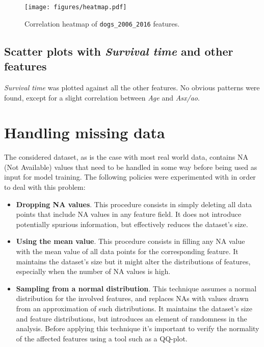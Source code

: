 \documentclass[12pt]{report}
\begin{document}
\begin{figure}[h]
  \centering
  	\texttt{[image: figures/heatmap.pdf]}
  \caption{Correlation heatmap of \texttt{dogs\_2006\_2016} features.}
  \label{corrheatmap}
\end{figure}

\subsection*{Scatter plots with \textit{Survival time} and other features}
\textit{Survival time} was plotted against all the other features. No obvious patterns were found, except for a slight correlation between \textit{Age} and \textit{Asx/ao}.

\section{Handling missing data}
The considered dataset, as is the case with most real world data, contains NA (Not Available) values that need to be handled in some way before being used as input for model training. The following policies were experimented with in order to deal with this problem:
\begin{itemize}
\item \textbf{Dropping NA values}. This procedure consists in simply deleting all data points that include NA values in any feature field. It does not introduce potentially spurious information, but effectively reduces the dataset's size.
\item \textbf{Using the mean value}. This procedure consists in filling any NA value with the mean value of all data points for the corresponding feature. It maintains the dataset's size but it might alter the distributions of features, especially when the number of NA values is high.
\item \textbf{Sampling from a normal distribution}. This technique assumes a normal distribution for the involved features, and replaces NAs with values drawn from an approximation of such distributions. It maintains the dataset's size and feature distributions, but introduces an element of randomness in the analysis. Before applying this technique it's important to verify the normality of the affected features using a tool such as a QQ-plot.
\end{itemize}
\end{document}
